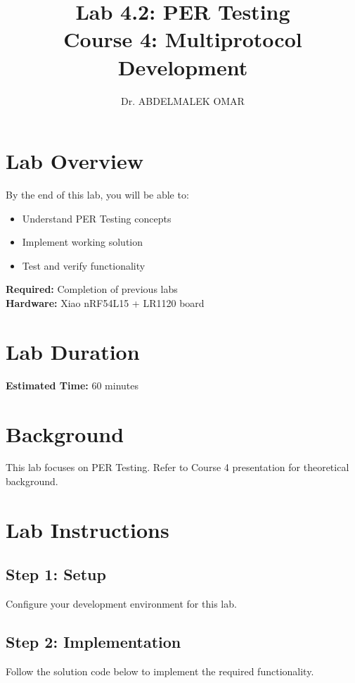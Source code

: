\documentclass[11pt,a4paper]{article}
\title{\textbf{Lab 4.2: PER Testing}\\
\large Course 4: Multiprotocol Development}
\author{Dr. ABDELMALEK OMAR}
\date{}
\begin{document}
\maketitle
\thispagestyle{fancy}

\section{Lab Overview}

\begin{objectivebox}
By the end of this lab, you will be able to:
\begin{itemize}
    \item Understand PER Testing concepts
    \item Implement working solution
    \item Test and verify functionality
\end{itemize}
\end{objectivebox}

\begin{prereqbox}
\textbf{Required:} Completion of previous labs\\
\textbf{Hardware:} Xiao nRF54L15 + LR1120 board
\end{prereqbox}

\section{Lab Duration}
\textbf{Estimated Time:} 60 minutes

\section{Background}

This lab focuses on PER Testing. Refer to Course 4 presentation for theoretical background.

\section{Lab Instructions}

\subsection{Step 1: Setup}
Configure your development environment for this lab.

\subsection{Step 2: Implementation}
Follow the solution code below to implement the required functionality.
\end{document}
